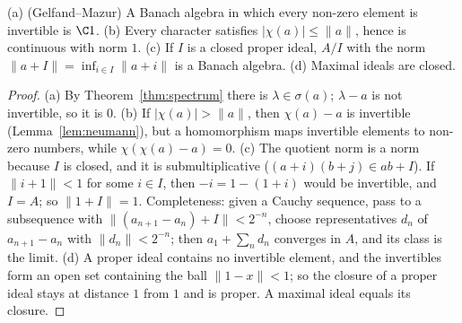 \begin{lemma}\label{lem:gelfandmazur}
(a) (Gelfand--Mazur) A Banach algebra in which every non-zero element is invertible is $\C1$. (b) Every character satisfies $|\chi(a)|\le\|a\|$, hence is continuous with norm $1$. (c) If $I$ is a closed proper ideal, $A/I$ with the
norm $\|a+I\|=\inf_{i\in I}\|a+i\|$ is a Banach algebra. (d) Maximal ideals are closed.
\end{lemma}
\begin{proof}
(a) By Theorem~\ref{thm:spectrum} there is $\lambda\in\sigma(a)$; $\lambda-a$ is not invertible, so it is $0$. (b) If $|\chi(a)|>\|a\|$, then $\chi(a)-a$ is invertible (Lemma~\ref{lem:neumann}), but a homomorphism maps invertible elements to
non-zero numbers, while $\chi(\chi(a)-a)=0$. (c) The quotient norm is a norm because $I$ is closed, and it is submultiplicative ($(a+i)(b+j)\in ab+I$). If $\|i+1\|<1$ for some $i\in I$, then $-i=1-(1+i)$ would be invertible, and $I=A$;
so $\|1+I\|=1$. Completeness: given a Cauchy sequence, pass to a subsequence with $\|(a_{n+1}-a_n)+I\|<2^{-n}$, choose representatives $d_n$ of $a_{n+1}-a_n$ with $\|d_n\|<2^{-n}$; then $a_1+\sum_nd_n$ converges in $A$, and its class is
the limit. (d) A proper ideal contains no invertible element, and the invertibles form an open set containing the ball $\|1-x\|<1$; so the closure of a proper ideal stays at distance $1$ from $1$ and is proper. A maximal ideal equals its closure.
\end{proof}

